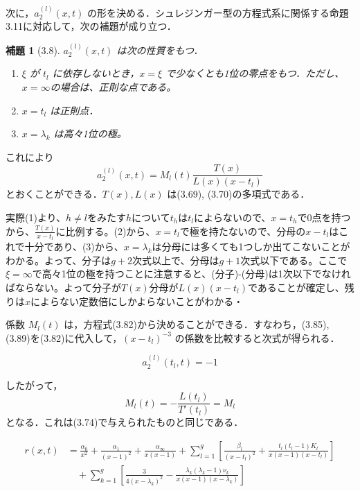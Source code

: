 \documentclass[paper=a4, fontsize=11pt]{jlreq} %
\newenvironment{story}{%
  \begin{mdframed}[
    backgroundcolor=red!5, %
    linewidth=0pt,         %
    innertopmargin=10pt,   %
    innerbottommargin=10pt,
    innerrightmargin=10pt, %
    innerleftmargin=10pt
  ]%
}{%
  \end{mdframed}%
}
\theoremstyle{break}
\newtheorem{lemma}[theorem]{補題}
\theoremstyle{qa}
\begin{document}
\begin{story}
次に，$a_2^{(l)}(x,t)$ の形を決める．シュレジンガー型の方程式系に関係する命題3.11に対応して，次の補題が成り立つ．
\begin{lemma}[3.8]
$a_2^{(l)}(x,t)$ は次の性質をもつ．
\begin{enumerate}
    \item[(1)] $\xi$ が $t_l$ に依存しないとき，$x=\xi$ で少なくとも1位の零点をもつ．ただし、$x=\infty$の場合は、正則な点である。
    \item[(2)] $x=t_l$ は正則点．
    \item[(3)] $x=\lambda_k$ は高々1位の極。
\end{enumerate}
\end{lemma}

これにより
\begin{equation}
    a_2^{(l)}(x,t) = M_l(t) \frac{T(x)}{L(x)(x-t_l)} \label{eq:3.89}
\end{equation}
とおくことができる．$T(x), L(x)$ は(3.69), (3.70)の多項式である．
\end{story}
実際(1)より、$h\neq l$をみたす$h$について$t_{h}$は$t_{l}$によらないので、$x=t_{h}$で0点を持つから、$\frac{T(x)}{x-t_{l}}$に比例する。(2)から、$x=t_{l}$で極を持たないので、分母の$x-t_{l}$はこれで十分であり、(3)から、$x=\lambda_{k}$は分母には多くても1つしか出てこないことがわかる。よって、分子は$g+2$次式以上で、分母は$g+1$次式以下である。ここで$\xi=\infty$で高々1位の極を持つことに注意すると、(分子)-(分母)は1次以下でなければならない。よって分子が$T(x)$分母が$L(x)(x-t_{l})$であることが確定し、残りは$x$によらない定数倍にしかよらないことがわかる・
\begin{story}
係数 $M_l(t)$ は，方程式(3.82)から決めることができる．すなわち，(3.85), (3.89)を(3.82)に代入して，$(x-t_l)^{-3}$ の係数を比較すると次式が得られる．
\end{story}

\begin{story}
\begin{equation*}
    a_2^{(l)}(t_l, t) = -1
\end{equation*}

したがって，
\begin{equation*}
    M_l(t) = -\frac{L(t_l)}{T'(t_l)} = M_l
\end{equation*}
となる．これは(3.74)で与えられたものと同じである．
\end{story}

\begin{align*}
    r(x,t) &= \frac{\alpha_0}{x^2} + \frac{\alpha_1}{(x-1)^2} + \frac{\alpha_\infty}{x(x-1)} + \sum_{l=1}^g \left[ \frac{\beta_l}{(x-t_l)^2} + \frac{t_l(t_l-1)K_l}{x(x-1)(x-t_l)} \right] \\
    &\quad + \sum_{k=1}^g \left[ \frac{3}{4(x-\lambda_k)^2} - \frac{\lambda_k(\lambda_k-1)\nu_k}{x(x-1)(x-\lambda_k)} \right]
\end{align*}
\end{document}
